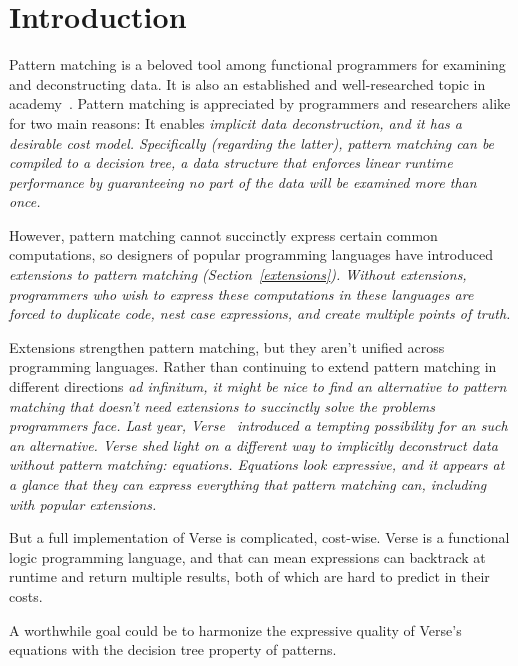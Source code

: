 \documentclass[manuscript,screen,review, 12pt, nonacm]{acmart}
\begin{document}
\section{Introduction}

Pattern matching is a beloved tool among functional programmers for examining
and deconstructing data. 
It is also an established and well-researched topic in
academy~\citep{burton1993pattern, palao1996new, wadler1987views, macqueen1985tree,
bpc}. Pattern matching is appreciated by programmers and researchers alike for
two main reasons: It enables \it{implicit} data deconstruction, and it has a
desirable cost model. Specifically (regarding the latter), pattern matching can
be compiled to a \it{decision tree}, a data structure that enforces linear
runtime performance by guaranteeing no part of the data will be examined more
than once.~\citep{maranget}

However, pattern matching cannot succinctly express certain common computations,
so designers of popular programming languages have introduced \it{extensions} to
pattern matching (Section~\ref{extensions}). Without extensions, programmers who
wish to express these computations in these languages are forced to duplicate
code, nest \it{case} expressions, and create multiple points of truth. 

Extensions strengthen pattern matching, but they aren't unified across
programming languages. Rather than continuing to extend pattern matching in
different directions \it{ad infinitum}, it might be nice to find an alternative
to pattern matching that doesn't need extensions to succinctly solve the
problems programmers face. Last year, Verse~\citep{verse} introduced
a tempting possibility for an such an alternative. Verse shed light on a
different way to implicitly deconstruct data without pattern matching:
\it{equations}. Equations look expressive, and it appears at a glance that they
can express everything that pattern matching can, including with popular
extensions. 

But a full implementation of Verse is complicated, cost-wise. Verse is a
functional logic programming language, and that can mean expressions can
backtrack at runtime and return multiple results, both of which are
hard to predict in their costs. 

A worthwhile goal could be to harmonize the expressive quality of Verse's
equations with the decision tree property of patterns.
\end{document}
